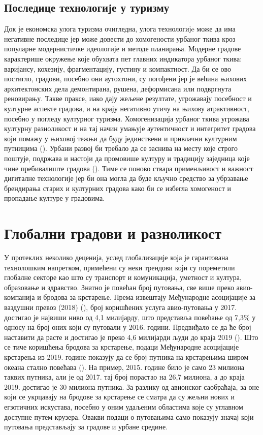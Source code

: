 \documentclass{article}
\begin{document}
\subsection{Последице технологије у туризму}
Док је економска улога туризма очигледна, улога технологијe може да има негативне последице јер може довести до хомогености урбаног ткива кроз популарне модернистичке идеологије и методе планирања. Модерне градове карактерише окружење које обухвата пет главних индикатора урбаног ткива: варијансу, кохезију, фрагментацију, густину и компактност. Да би се ово постигло, градови, посебно они аутохтони, су погођени јер је већина њихових архитектонских дела демонтирана, рушена, деформисана или подвргнута реновирању. Такве праксе, иако дају жељене резултате, угрожавају посебност и културне аспекте градова, и на крају негативно утичу на њихову атрактивност, посебно у погледу културног туризма. Хомогенизација урбаног ткива угрожава културну разноликост и на тај начин умањује аутентичност и интегритет градова који помажу у њиховој тежњи да буду јединствени и привлачни културним путницима (\cite{meyer}). Урбани развој би требало да се заснива на месту које строго поштује, подржава и настоји да промовише културу и традицију заједница које чине пребивалиште градова (\cite{unhabitat3}). Тиме се поново ствара применљивост и важност дигиталне технологије јер би она могла да буде кључно средство за убрзавање брендирања старих и културних градова како би се избегла хомогеност и пропадање културе у градовима.

\section{Глобални градови и разноликост}

У протеклих неколико деценија, услед глобализације која је гарантована технолошким напретком, примећени су неки трендови који су пореметили глобалне секторе као што су транспорт и комуникација, уметност и култура, образовање и здравство. Знатно је повећан број путовања, све више преко авио-компанија и бродова за крстарење. Према извештају Међународне асоцијације за ваздушни превоз (2018) (\cite{avioni}), број коришћених услуга авио-путовања у 2017. достигао је највиши ниво од 4,1 милијарду, што представља повећање од 7,3\% у односу на број оних који су путовали у 2016. години. Предвиђало се да ће број наставити да расте и достигао је преко 4,6 милијарди људи до краја 2019 (\cite{mazarenau}). Што се тиче коришћења бродова за крстарење, подаци Међународне асоцијације крстарења из 2019. године показују да се број путника на крстарењима широм океана стално повећава (\cite{kennedy}). На пример, 2015. године било је само 23 милиона таквих путника, али је од 2017. тај број порастао на 26,7 милиона, а до краја 2019. достигао је 30 милиона путника. За разлику од авионског саобраћаја, за оне који се укрцавају на бродове за крстарење се сматра да су жељни нових и егзотичних искустава, посебно у оним удаљеним областима које су углавном доступне путем крузера. Овакви подаци о путовањима само показују значај који путовања представљају за градове и урбане средине.
\end{document}

